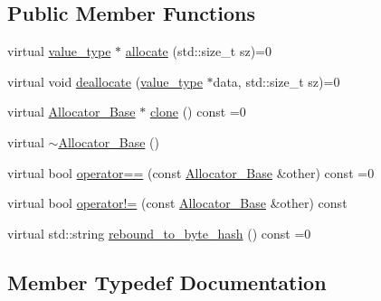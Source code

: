 \subsection*{Public Member Functions}
\begin{DoxyCompactItemize}
\item 
virtual \hyperlink{structbc_1_1allocators_1_1pa__detail_1_1Allocator__Base_afb5e955c647a4b6742010e2790398b1c}{value\+\_\+type} $\ast$ \hyperlink{structbc_1_1allocators_1_1pa__detail_1_1Allocator__Base_aa22794436cb3abefc059bde0eb08a23f}{allocate} (std\+::size\+\_\+t sz)=0
\item 
virtual void \hyperlink{structbc_1_1allocators_1_1pa__detail_1_1Allocator__Base_a02eb1291b28c3d83c53f973df47b9caa}{deallocate} (\hyperlink{structbc_1_1allocators_1_1pa__detail_1_1Allocator__Base_afb5e955c647a4b6742010e2790398b1c}{value\+\_\+type} $\ast$data, std\+::size\+\_\+t sz)=0
\item 
virtual \hyperlink{structbc_1_1allocators_1_1pa__detail_1_1Allocator__Base}{Allocator\+\_\+\+Base} $\ast$ \hyperlink{structbc_1_1allocators_1_1pa__detail_1_1Allocator__Base_abb9ba3168afaead6638e81f618f74b48}{clone} () const =0
\item 
virtual \hyperlink{structbc_1_1allocators_1_1pa__detail_1_1Allocator__Base_af497fc08777a9b271862b5947ebfbaf1}{$\sim$\+Allocator\+\_\+\+Base} ()
\item 
virtual bool \hyperlink{structbc_1_1allocators_1_1pa__detail_1_1Allocator__Base_a044ccf83e8abc449aeba1b6c7cc7355d}{operator==} (const \hyperlink{structbc_1_1allocators_1_1pa__detail_1_1Allocator__Base}{Allocator\+\_\+\+Base} \&other) const =0
\item 
virtual bool \hyperlink{structbc_1_1allocators_1_1pa__detail_1_1Allocator__Base_af752625f3178c2ed57515e0607fbec0e}{operator!=} (const \hyperlink{structbc_1_1allocators_1_1pa__detail_1_1Allocator__Base}{Allocator\+\_\+\+Base} \&other) const
\item 
virtual std\+::string \hyperlink{structbc_1_1allocators_1_1pa__detail_1_1Allocator__Base_a2a90a282042dc49c3c43306b2766ba83}{rebound\+\_\+to\+\_\+byte\+\_\+hash} () const =0
\end{DoxyCompactItemize}


\subsection{Member Typedef Documentation}
\mbox{\label{structbc_1_1allocators_1_1pa__detail_1_1Allocator__Base_ad85cad33901196bc10affe231300c020}} 
